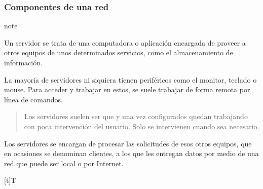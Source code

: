 \documentclass[letterpaper,10pt,spanish]{sphinxmanual}
\let\sphinxpxdimen\pdfpxdimen\else\newdimen\sphinxpxdimen
\begin{document}
\subsubsection{Componentes de una red}
\label{\detokenize{1_guias/10informatica/G1003:componentes-de-una-red}}
\begin{sphinxadmonition}{note}{}

\sphinxAtStartPar
Un servidor se trata de una computadora o aplicación encargada de proveer a otros equipos de unos determinados servicios, como el almacenamiento de información.

\sphinxAtStartPar
La mayoría de servidores ni siquiera tienen periféricos como el monitor, teclado o mouse. Para acceder y trabajar en estos, se suele trabajar de forma remota por línea de comandos.
\begin{quote}

\sphinxAtStartPar
Los servidores suelen ser  que  y una vez configurados quedan trabajando con poca intervención del usuario. Solo se intervienen cuando sea necesario.
\end{quote}

\sphinxAtStartPar
Los servidores se encargan de procesar las solicitudes de esos otros equipos, que en ocasiones se denominan clientes, a los que les entregan datos por medio de una red que puede ser local o por Internet.


\begin{savenotes}\sphinxattablestart
\sphinxthistablewithglobalstyle
\centering
\begin{tabulary}{\linewidth}[t]{T}
\sphinxtoprule
\sphinxtableatstartofbodyhook

\begin{sphinxfigure-in-table}
\centering
\capstart
\noindent\sphinxincludegraphics[width=400\sphinxpxdimen]{{image041}.png}
\label{\detokenize{1_guias/10informatica/G1003:id4}}\end{sphinxfigure-in-table}\relax
\\
\sphinxbottomrule
\end{tabulary}
\sphinxtableafterendhook\par
\sphinxattableend\end{savenotes}
\end{sphinxadmonition}
\end{document}
